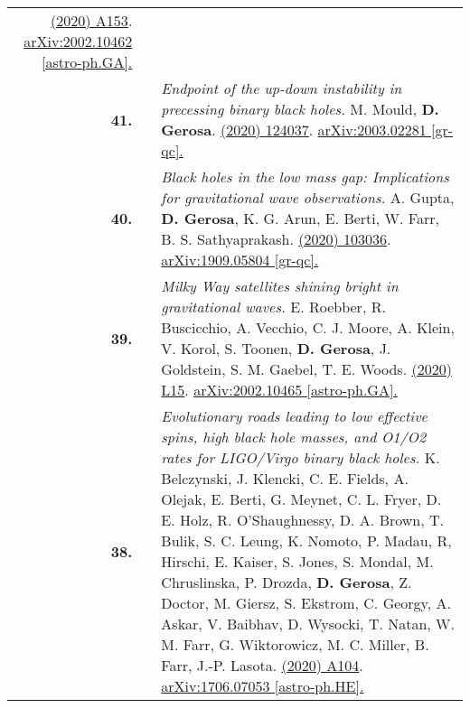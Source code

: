 {\begin{longtable}{rp{0.3cm}p{15.8cm}}
\href{https://www.aanda.org/articles/aa/abs/2020/06/aa37764-20/aa37764-20.html}{\aap 638 (2020) A153}. \href{https://arxiv.org/abs/2002.10462}{arXiv:2002.10462 [astro-ph.GA].}
\vspace{0.09cm}\\
%
\textbf{41.} & & \textit{Endpoint of the up-down instability in precessing binary black holes.}
\newline{}
M. Mould, \textbf{D. Gerosa}.
\newline{}
\href{https://journals.aps.org/prd/abstract/10.1103/PhysRevD.101.124037}{\prd 101 (2020) 124037}. \href{https://arxiv.org/abs/2003.02281}{arXiv:2003.02281 [gr-qc].}
\vspace{0.09cm}\\
%
\textbf{40.} & & \textit{Black holes in the low mass gap: Implications for gravitational wave observations.}
\newline{}
A. Gupta, \textbf{D. Gerosa}, K. G. Arun, E. Berti, W. Farr, B. S. Sathyaprakash.
\newline{}
\href{https://journals.aps.org/prd/abstract/10.1103/PhysRevD.101.103036}{\prd 101 (2020) 103036}. \href{https://arxiv.org/abs/1909.05804}{arXiv:1909.05804 [gr-qc].}
\vspace{0.09cm}\\
%
\textbf{39.} & & \textit{Milky Way satellites shining bright in gravitational waves.}
\newline{}
E. Roebber, R. Buscicchio, A. Vecchio, C. J. Moore, A. Klein, V. Korol, S. Toonen, \textbf{D. Gerosa}, J. Goldstein, S. M. Gaebel, T. E. Woods.
\newline{}
\href{https://iopscience.iop.org/article/10.3847/2041-8213/ab8ac9}{\apjl 894 (2020) L15}. \href{https://arxiv.org/abs/2002.10465}{arXiv:2002.10465 [astro-ph.GA].}
\vspace{0.09cm}\\
%
\textbf{38.} & & \textit{Evolutionary roads leading to low effective spins, high black hole masses, and O1/O2 rates for LIGO/Virgo binary black holes.}
\newline{}
K. Belczynski, J. Klencki, C. E. Fields, A. Olejak, E. Berti, G. Meynet, C. L. Fryer, D. E. Holz, R. O'Shaughnessy, D. A. Brown, T. Bulik, S. C. Leung,  K. Nomoto, P. Madau, R, Hirschi, E. Kaiser, S. Jones, S. Mondal, M. Chruslinska, P. Drozda, \textbf{D. Gerosa}, Z. Doctor, M. Giersz, S. Ekstr\:om, C. Georgy, A. Askar, V. Baibhav, D. Wysocki, T. Natan, W. M. Farr, G. Wiktorowicz, M. C. Miller, B. Farr, J.-P. Lasota.
\newline{}
\href{https://www.aanda.org/articles/aa/full_html/2020/04/aa36528-19/aa36528-19.html}{\aap 636 (2020) A104}. \href{https://arxiv.org/abs/1706.07053}{arXiv:1706.07053 [astro-ph.HE].}

\end{longtable}}
